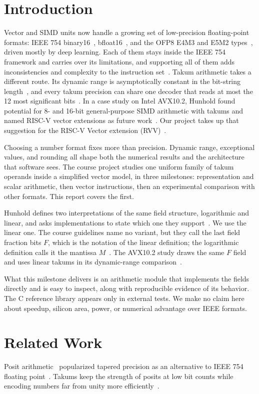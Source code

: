 \documentclass[conference]{IEEEtran}
\begin{document}
\section{Introduction}
Vector and SIMD units now handle a growing set of low-precision floating-point
formats: IEEE 754 binary16~\cite{ieee754}, bfloat16~\cite{bfloat16}, and the
OFP8 E4M3 and E5M2 types~\cite{ofp8}, driven mostly by deep learning. Each of
them stays inside the IEEE 754 framework and carries over its limitations, and
supporting all of them adds inconsistencies and complexity to the instruction
set~\cite{simd}. Takum arithmetic takes a different route. Its dynamic range is
asymptotically constant in the bit-string length~\cite{takum}, and every takum
precision can share one decoder that reads at most the 12 most significant
bits~\cite{simd}. In a case study on Intel AVX10.2, Hunhold found potential for
8- and 16-bit general-purpose SIMD arithmetic with takums and named RISC-V
vector extensions as future work~\cite{simd}. Our project takes up that
suggestion for the RISC-V Vector extension (RVV)~\cite{rvv}.

Choosing a number format fixes more than precision. Dynamic range, exceptional
values, and rounding all shape both the numerical results and the architecture
that software sees. The course project studies one uniform family of takum
operands inside a simplified vector model, in three milestones: representation
and scalar arithmetic, then vector instructions, then an experimental comparison
with other formats. This report covers the first.

Hunhold defines two interpretations of the same field structure, logarithmic
and linear, and asks implementations to state which one they
support~\cite{takum}. We use the linear one. The course guidelines name no
variant, but they call the last field fraction bits $F$, which is the notation
of the linear definition; the logarithmic definition calls it the mantissa
$M$~\cite{takum}. The AVX10.2 study draws the same $F$ field and uses linear
takums in its dynamic-range comparison~\cite{simd}.

What this milestone delivers is an arithmetic module that implements the fields
directly and is easy to inspect, along with reproducible evidence of its
behavior. The C reference library appears only in external tests. We make no
claim here about speedup, silicon area, power, or numerical advantage over IEEE
formats.

\section{Related Work}
Posit arithmetic~\cite{posit} popularized tapered precision as an alternative
to IEEE 754 floating point~\cite{ieee754}. Takums keep the strength of posits at
low bit counts while encoding numbers far from unity more efficiently~\cite{takum}.
\end{document}
